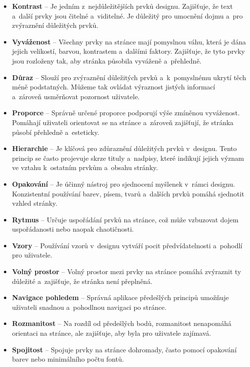 \begin{itemize}
  \item \textbf{Kontrast} -- Je jedním z~nejdůležitějších prvků designu. Zajišťuje, že text a~další prvky jsou čitelné a~viditelné. Je důležitý pro umocnění dojmu a~pro zvýraznění důležitých prvků.
  \item \textbf{Vyváženost} -- Všechny prvky na stránce mají pomyslnou váhu, která je dána jejich velikostí, barvou, kontrastem a~dalšími faktory. Zajišťuje, že tyto prvky jsou rozloženy tak, aby stránka působila vyváženě a~přehledně.
  \item \textbf{Důraz} -- Slouží pro zvýraznění důležitých prvků a~k~pomyslnému ukrytí těch méně podstatných. Můžeme tak ovládat výraznost jistých informací a~zároveň usměrňovat pozornost uživatele.
  \item \textbf{Proporce} -- Správně určené proporce podporují výše zmíněnou vyváženost. Pomáhají uživateli orientovat se na stránce a~zároveň zajišťují, že stránka působí přehledně a~esteticky.
  \item \textbf{Hierarchie} -- Je klíčová pro zdůraznění důležitých prvků v~designu. Tento princip se často projevuje skrze tituly a~nadpisy, které indikují jejich význam ve vztahu k~ostatním prvkům a~obsahu stránky.
  \item \textbf{Opakování} -- Je účinný nástroj pro sjednocení myšlenek v~rámci designu. Konzistentní používání barev, písem, tvarů a~dalších prvků pomáhá sjednotit vzhled stránky.
  \item \textbf{Rytmus} -- Určuje uspořádání prvků na stránce, což může vzbuzovat dojem uspořádanosti nebo naopak chaotičnosti.
  \item \textbf{Vzory} -- Používání vzorů v~designu vytváří pocit předvídatelnosti a~pohodlí pro uživatele.
  \item \textbf{Volný prostor} -- Volný prostor mezi prvky na stránce pomáhá zvýraznit ty důležité a~zajišťuje, že stránka není přeplněná.
  \item \textbf{Navigace pohledem} -- Správná aplikace předešlých principů umožňuje uživateli snadnou a~pohodlnou navigaci po stránce.
  \item \textbf{Rozmanitost} -- Na rozdíl od předešlých bodů, rozmanitost nenapomáhá orientaci na stránce, ale zajišťuje, aby byla pro uživatele zajímavá.
  \item \textbf{Spojitost} -- Spojuje prvky na stránce dohromady, často pomocí opakování barev nebo minimálního počtu fontů.
\end{itemize}

